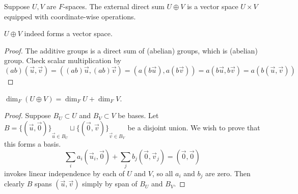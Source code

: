 \begin{definition}
    Suppose \(U,V\) are \(F\)-spaces.
    The external direct sum \(U \oplus V\)
    is a vector space \(U \times V\)
    equipped with coordinate-wise operations.
\end{definition}
\begin{lemma}
    \(U \oplus V\) indeed forms a vector space.
\end{lemma}
\begin{proof}
    The additive groups is a direct sum of (abelian) groups,
    which is (abelian) group.
    Check scalar multiplication by
    \begin{equation*}
        (ab)(\vec{u},\vec{v}) = ((ab)\vec{u},(ab)\vec{v})
        = (a(b\vec{u}),a(b\vec{v})) = a(b\vec{u},b\vec{v})
        = a(b(\vec{u},\vec{v}))
    \end{equation*}
\end{proof}
\begin{lemma}
    \(\dim_F(U \oplus V) = \dim_F U + \dim_F V\).
\end{lemma}
\begin{proof}
    Suppose \(B_U \subset U\) and \(B_V \subset V\) be bases.
    Let \(B = {\{(\vec{u},\vec{0})\}}_{\vec{u} \in B_U} \sqcup
    {\{(\vec{0},\vec{v})\}}_{\vec{v} \in B_V}\) be a disjoint union.
    We wish to prove that this forms a basis.
    \begin{equation*}
        \sum_i a_i(\vec{u}_i,\vec{0}) + \sum_j b_j(\vec{0},\vec{v}_j)
        = (\vec{0},\vec{0})
    \end{equation*}
    invokes linear independence by each of \(U\) and \(V\),
    so all \(a_i\) and \(b_j\) are zero.
    Then clearly \(B\) spans \((\vec{u},\vec{v})\)
    simply by span of \(B_U\) and \(B_V\).
\end{proof}


